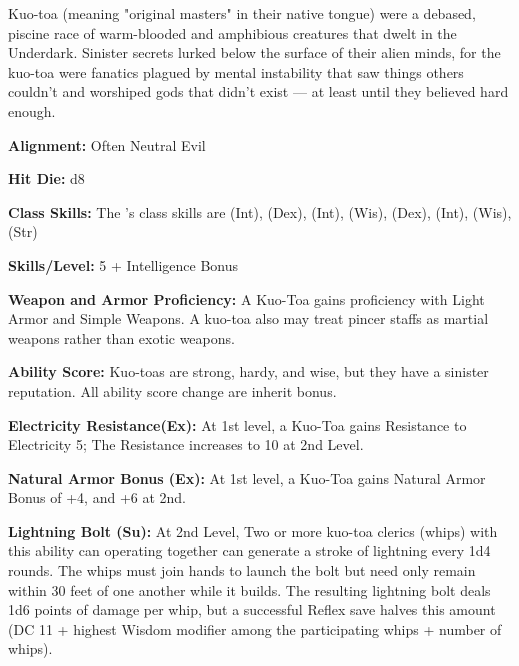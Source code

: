 
Kuo-toa (meaning "original masters" in their native tongue) were a debased, piscine race of warm-blooded and amphibious creatures that dwelt in the Underdark. Sinister secrets lurked below the surface of their alien minds, for the kuo-toa were fanatics plagued by mental instability that saw things others couldn't and worshiped gods that didn't exist — at least until they believed hard enough.

\textbf{Alignment:} Often Neutral Evil

\textbf{Hit Die:} d8

\textbf{Class Skills:} The \currentclassname{}'s class skills are  (Int),  (Dex),  (Int),  (Wis),  (Dex),  (Int),  (Wis),  (Str)

\textbf{Skills/Level:} 5 + Intelligence Bonus

\goodbab{}
\poorfor{}
\goodref{}
\goodwil{}

\begin{classtable}
\end{classtable}

\classfeatures

\textbf{Weapon and Armor Proficiency:} A Kuo-Toa gains proficiency with Light Armor and Simple Weapons. A kuo-toa also may treat pincer staffs as martial weapons rather than exotic weapons.

\textbf{Ability Score:} Kuo-toas are strong, hardy, and wise, but they have a sinister reputation. All ability score change are inherit bonus.
 
 \textbf{Electricity Resistance(Ex):} At 1st level, a Kuo-Toa gains Resistance to Electricity 5; The Resistance increases to 10 at 2nd Level.
 
 \textbf{Natural Armor Bonus (Ex):} At 1st level, a Kuo-Toa gains Natural Armor Bonus of +4, and +6 at 2nd.
 
\textbf{Lightning Bolt (Su):} At 2nd Level, Two or more kuo-toa clerics (whips) with this ability can operating together can generate a stroke of lightning every 1d4 rounds. The whips must join hands to launch the bolt but need only remain within 30 feet of one another while it builds. The resulting lightning bolt deals 1d6 points of damage per whip, but a successful Reflex save halves this amount (DC 11 + highest Wisdom modifier among the participating whips + number of whips).